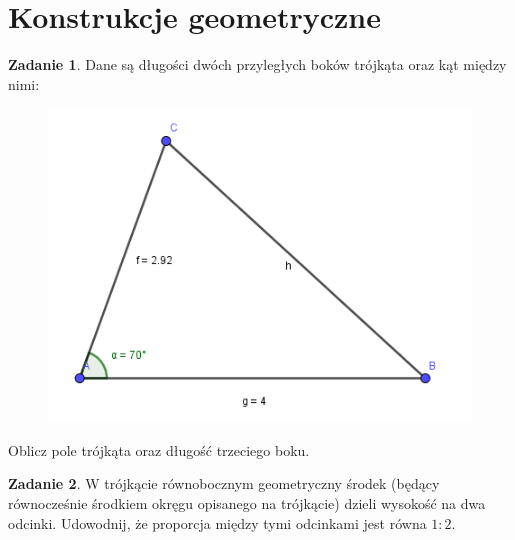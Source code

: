 \documentclass[11pt]{article}
\theoremstyle{definition}
\newtheorem{zad}{Zadanie}
\numberwithin{zad}{section}
\begin{document}
%
%
%
%
%
%

\section{Konstrukcje geometryczne}

\begin{zad}
Dane są długości dwóch przyległych boków trójkąta oraz kąt między nimi:

\begin{figure}[h]
\centering
\includegraphics[width=0.5\linewidth]{triangle.png}
\end{figure}
Oblicz pole trójkąta oraz długość trzeciego boku.
\end{zad}

\begin{zad}
W trójkącie równobocznym geometryczny środek (będący równocześnie środkiem okręgu opisanego na trójkącie) dzieli wysokość na dwa odcinki. Udowodnij, że proporcja między tymi odcinkami jest równa $1:2$.
\end{zad}
\end{document}

